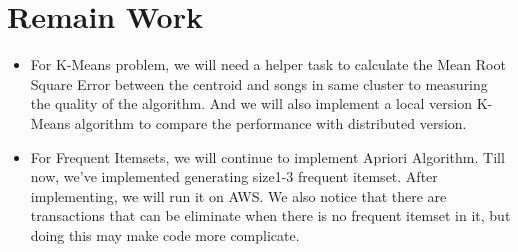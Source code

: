 \documentclass[11pt]{article} %
\begin{document}
\section{Remain Work}
\begin{itemize}
\item For K-Means problem, we will need a helper task to calculate the Mean Root Square Error between the centroid and songs in same cluster to measuring the quality of the algorithm. And we will also implement a local version K-Means algorithm to compare the performance with distributed version.
\item For Frequent Itemsets, we will continue to implement Apriori Algorithm. Till now, we've implemented generating size1-3 frequent itemset. After implementing, we will run it on AWS. We also notice that there are transactions that can be eliminate when there is no frequent itemset in it, but doing this may make code more complicate. 
\end{itemize}
\end{document}
